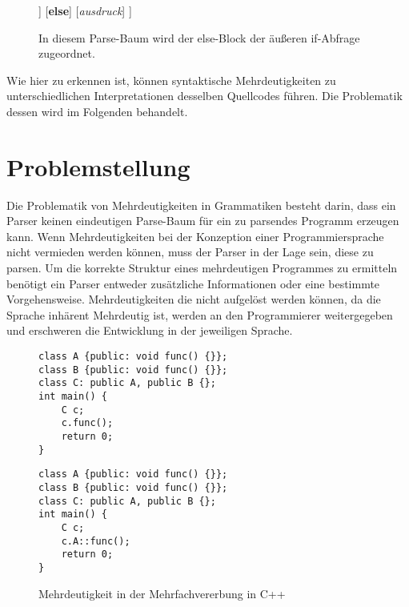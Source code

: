 \documentclass[runningheads]{llncs}
\begin{document}
	\begin{figure}
		\centering
		\begin{forest}
		[\textit{ausdruck}
		[\textbf{if}]
		[\textit{bedingung}]
		[\textbf{then}]
		[\textit{ausdruck}
		[\textbf{if}]
		[\textit{bedingung}]
		[\textbf{then}]
		[\textit{ausdruck}]
		]
		[\textbf{else}]
		[\textit{ausdruck}]
		]
		\end{forest}
		\caption{In diesem Parse-Baum wird der else-Block der äußeren if-Abfrage zugeordnet.}
		\label{fig:figure2}
	\end{figure}

	Wie hier zu erkennen ist,
	können syntaktische Mehrdeutigkeiten zu unterschiedlichen Interpretationen desselben Quellcodes führen.
	Die Problematik dessen wird im Folgenden behandelt.


	\section{Problemstellung}

	Die Problematik von Mehrdeutigkeiten in Grammatiken besteht darin,
	dass ein Parser keinen eindeutigen Parse-Baum für ein zu parsendes Programm erzeugen kann.
	Wenn Mehrdeutigkeiten bei der Konzeption einer Programmiersprache nicht vermieden werden können,
	muss der Parser in der Lage sein, diese zu parsen.
	Um die korrekte Struktur eines mehrdeutigen Programmes zu ermitteln benötigt ein Parser
	entweder zusätzliche Informationen oder eine bestimmte Vorgehensweise.
	Mehrdeutigkeiten die nicht aufgelöst werden können, da die Sprache inhärent Mehrdeutig ist,
	werden an den Programmierer weitergegeben und erschweren die Entwicklung in der jeweiligen Sprache.



	\begin{figure}
		\centering
		\begin{minipage}{0.48\textwidth}
			\begin{lstlisting}[style=lstStyle,label={lst:lstlisting1}]
class A {public: void func() {}};
class B {public: void func() {}};
class C: public A, public B {};
int main() {
	C c;
	c.func();
	return 0;
}
			\end{lstlisting}
		\end{minipage}
		\hfill
		\begin{minipage}{0.48\textwidth}
			\begin{lstlisting}[style=lstStyle,label={lst:lstlisting2}]
class A {public: void func() {}};
class B {public: void func() {}};
class C: public A, public B {};
int main() {
	C c;
	c.A::func();
	return 0;
}
			\end{lstlisting}
		\end{minipage}
		\caption{Mehrdeutigkeit in der Mehrfachvererbung in C++}
		\label{fig:figure3}
	\end{figure}
\end{document}
